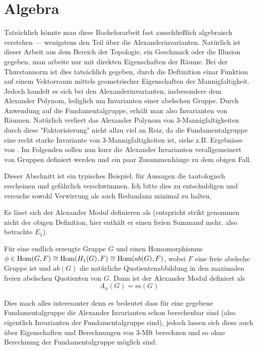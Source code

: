 
\section{Algebra}

Tatsächlich könnte man diese Bachelorarbeit fast ausschließlich algebraisch verstehen --- wenigstens den Teil über die Alexanderinvarianten. Natürlich ist dieser Arbeit aus dem Bereich der Topologie, ein Geschmack oder die Illusion gegeben, man arbeite nur mit direkten Eigenschaften der Räume. Bei der Thurstonnorm ist dies tatsächlich gegeben, durch die Deftinition einar Funktion auf einem Vektorraum mittels geometrischer Eigenschaften der Mannigfaltigkeit. Jedoch handelt es sich bei den Alexanderinvarianten, insbesondere dem Alexander Polynom, lediglich um Invarianten einer abelschen Gruppe. Durch Anwendung auf die Fundamentalgruppe, erhält man also Invarianten von Räumen. Natürlich verliert das Alexander Polynom von 3-Mannigfaltigkeiten durch diese "Faktorisierung" nicht allzu viel an Reiz, da die Fundamentalgruppe eine recht starke Invariante von 3-Mannigfaltigkeiten ist, siehe z.B. Ergebnisse von  . Im Folgenden sollen nun kurz die Alexander Invarianten verallgemeinert von Gruppen definiert werden und ein paar Zusammenhänge zu dem obigen Fall.

Dieser Abschnitt ist ein typisches Beispiel, für Aussagen die tautologisch erscheinen und gefährlich verschwimmen. Ich bitte dies zu entschuldigen und versuche sowohl Verwirrung als auch Redundanz minimal zu halten.

Es lässt sich der Alexander Modul definieren als (entspricht strikt genommen nicht der obigen Definition, hier enthält er einen freien Summand mehr, also betrachte $E_1$).

\begin{defn}
	Für eine endlich erzeugte Gruppe $G$ und einen Homomorphismus $\phi \in \operatorname{Hom}(G,F) \cong \operatorname{Hom}(H_1(G),F) \cong \operatorname{Hom}(ab(G),F)$, wobei $F$ eine freie abelsche Gruppe ist und $ab(G)$ die natürliche Quotientenabbildung in den maximalen freien abelschen Quotienten von $G$. Dann ist der Alexander Modul definiert als
	\[
		A_\phi(G)=m(G)
	\]
\end{defn}

Dies mach alles interesanter denn es bedeutet dass für eine gegebene Fundamentalgruppe die Alexander Invarianten schon berechenbar sind (also eigentlich Invarianten der Fundamentalgruppe sind), jedoch lassen sich diese auch über Eigenschaften und Berechnungen von 3-Mft berechnen und so ohne Berechnung der Fundamentalgruppe möglich sind. 


